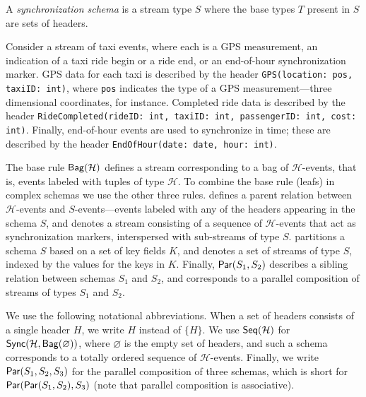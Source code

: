 \begin{definition}
A \emph{synchronization schema} is a stream type $S$
where the base types $T$ present in $S$ are sets of headers.
\end{definition}

\begin{example}
\label{45:ex:taxi-distance-schema-headers}
Consider a stream of taxi events, where each is a GPS measurement, an indication of a taxi ride begin or a ride end, or an end-of-hour synchronization marker.
GPS data for each taxi is described by the header \texttt{GPS(location: pos, taxiID: int)}, where \texttt{pos} indicates the type of a GPS measurement---three dimensional coordinates, for instance.
Completed ride data is described by the header \texttt{RideCompleted(rideID: int, taxiID: int, passengerID: int, cost: int)}.
Finally, end-of-hour events are used to synchronize in time; these are described by the header \texttt{EndOfHour(date: date, hour: int)}.
\end{example}

The base rule $\mathsf{Bag}({\mathcal{H}})$  defines a stream corresponding to a bag of $\mathcal{H}$-events, that is, events labeled with tuples of type $\mathcal{H}$. To combine the base rule (leafs) in complex schemas we use the other three rules.  defines a parent relation between $\mathcal{H}$-events
and $S$-events---events labeled with any of the headers appearing in the schema $S$, and denotes a stream consisting of a sequence of $\mathcal{H}$-events that act as synchronization markers, interspersed with sub-streams of type $S$.
 partitions a schema $S$ based on a set of key fields $K$,
and denotes a set of streams of type $S$, indexed by the values for the keys in $K$.
Finally, $\mathsf{Par}({S_1}, {S_2})$ describes a sibling relation between schemas $S_1$ and $S_2$,  and corresponds to a parallel composition
of streams of types $S_1$ and $S_2$.

We use the following notational abbreviations.
When a set of headers consists of a single header $H$, we write $H$ instead of $\{H\}$.
We use $\mathsf{Seq}({\mathcal{H}})$ for
$\mathsf{Sync}({\mathcal{H}}, \mathsf{Bag}({\varnothing}))$,
 where $\varnothing$ is the empty set of headers, and such a schema corresponds to a totally ordered sequence of $\mathcal{H}$-events.
Finally, we write $\mathsf{Par}({{S}_1}, {{S}_2}, {{S}_3})$
for the parallel composition of three schemas, which is short for
$\mathsf{Par}({\mathsf{Par}({{S}_1}, {{S}_2})}, {{S}_3})$ (note that parallel composition is associative).

